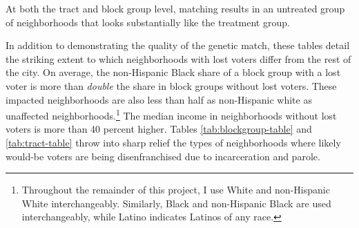 \documentclass[12pt,]{article}
\let\rmarkdownfootnote\footnote%
\def\footnote{\protect\rmarkdownfootnote}
\begin{document}
\begin{table}[H]

\caption{\label{tab:tract-table-chunk}\label{tab:tract-table} Results of Tract-Level Matching}
\centering
{}
\end{table}

At both the tract and block group level, matching results in an untreated group of neighborhoods that looks substantially like the treatment group.

In addition to demonstrating the quality of the genetic match, these tables detail the striking extent to which neighborhoods with lost voters differ from the rest of the city. On average, the non-Hispanic Black share of a block group with a lost voter is more than \emph{double} the share in block groups without lost voters. These impacted neighborhoods are also less than half as non-Hispanic white as unaffected neighborhoods.\footnote{Throughout the remainder of this project, I use White and non-Hispanic White interchangeably. Similarly, Black and non-Hispanic Black are used interchangeably, while Latino indicates Latinos of any race.} The median income in neighborhoods without lost voters is more than 40 percent higher. Tables \ref{tab:blockgroup-table} and \ref{tab:tract-table} throw into sharp relief the types of neighborhoods where likely would-be voters are being disenfranchised due to incarceration and parole.
\end{document}
